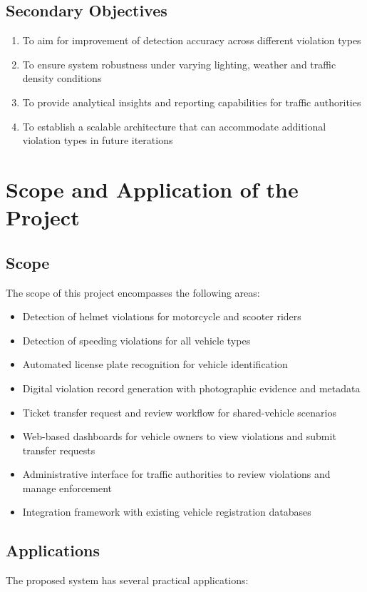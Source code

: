 \documentclass[12pt, a4paper, oneside]{memoir}
\begin{document}
\subsection{Secondary Objectives}
\begin{enumerate}
    \item To aim for improvement of detection accuracy across different violation types
    \item To ensure system robustness under varying lighting, weather and traffic density conditions
    \item To provide analytical insights and reporting capabilities for traffic authorities
    \item To establish a scalable architecture that can accommodate additional violation types in future iterations
\end{enumerate}

\section{Scope and Application of the Project}

\subsection{Scope}
The scope of this project encompasses the following areas:

\begin{itemize}
    \item Detection of helmet violations for motorcycle and scooter riders
    \item Detection of speeding violations for all vehicle types
    \item Automated license plate recognition for vehicle identification
    \item Digital violation record generation with photographic evidence and metadata
    \item Ticket transfer request and review workflow for shared-vehicle scenarios
    \item Web-based dashboards for vehicle owners to view violations and submit transfer requests
    \item Administrative interface for traffic authorities to review violations and manage enforcement
    \item Integration framework with existing vehicle registration databases
\end{itemize}

\subsection{Applications}
The proposed system has several practical applications:
\end{document}
